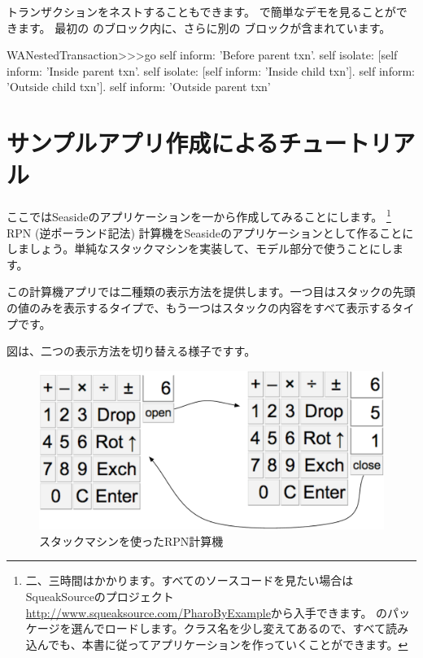 \documentclass[a4paper,10pt,twoside]{book}
\begin{document}
トランザクションをネストすることもできます。 で簡単なデモを見ることができます。
最初の のブロック内に、さらに別の ブロックが含まれています。

\begin{code}{}
WANestedTransaction>>>go
	self inform: 'Before parent txn'.
	self isolate:
			[self inform: 'Inside parent txn'.
			self isolate: [self inform: 'Inside child txn'].
			self inform: 'Outside child txn'].
	self inform: 'Outside parent txn'
\end{code}


\section{サンプルアプリ作成によるチュートリアル}


ここではSeasideのアプリケーションを一から作成してみることにします。 \footnote{二、三時間はかかります。すべてのソースコードを見たい場合はSqueakSourceのプロジェクト \url{http://www.squeaksource.com/PharoByExample}から入手できます。 のパッケージを選んでロードします。クラス名を少し変えてあるので、すべて読み込んでも、本書に従ってアプリケーションを作っていくことができます。}
RPN (逆ポーランド記法) 計算機をSeasideのアプリケーションとして作ることにしましょう。単純なスタックマシンを実装して、モデル部分で使うことにします。

この計算機アプリでは二種類の表示方法を提供します。一つ目はスタックの先頭の値のみを表示するタイプで、もう一つはスタックの内容をすべて表示するタイプです。

図は、二つの表示方法を切り替える様子ですす。

\begin{figure}[ht]
\begin{center}
\includegraphics[width=\textwidth]{stackMachine}
\caption{スタックマシンを使ったRPN計算機}
\end{center}
\end{figure}
\end{document}
